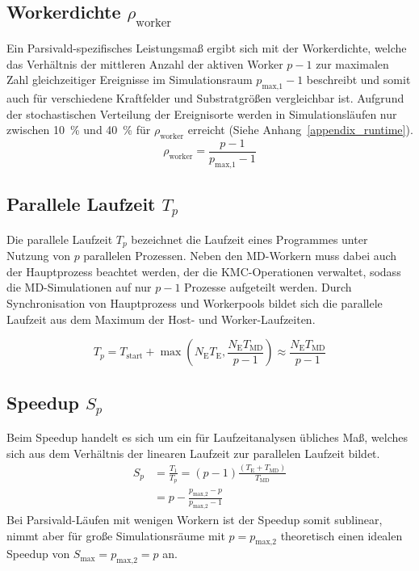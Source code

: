 \subsection{Workerdichte \texorpdfstring{$\rho_\text{worker}$}{rhoworker}}

Ein Parsivald-spezifisches Leistungsmaß ergibt sich mit der Workerdichte, welche das Verhältnis der mittleren Anzahl der aktiven Worker $p-1$ zur maximalen Zahl gleichzeitiger Ereignisse im Simulationsraum $p_\text{max,1}-1$ beschreibt und somit auch für verschiedene Kraftfelder und Substratgrößen vergleichbar ist.
Aufgrund der stochastischen Verteilung der Ereignisorte werden in Simulationsläufen nur zwischen \SI{10}{\percent} und \SI{40}{\percent} für $\rho_\text{worker}$ erreicht (Siehe Anhang~\ref{appendix_runtime}).
\begin{equation}
  \rho_\text{worker} = \frac{p - 1}{p_\text{max,1} - 1}
  \label{eq:workerdensity}
\end{equation}

\subsection{Parallele Laufzeit \texorpdfstring{$T_p$}{Tp}}

Die parallele Laufzeit $T_p$ bezeichnet die Laufzeit eines Programmes unter Nutzung von $p$ parallelen Prozessen.
Neben den MD-Workern muss dabei auch der Hauptprozess beachtet werden, der die KMC-Operationen verwaltet, sodass die MD-Simulationen auf nur $p-1$ Prozesse aufgeteilt werden.
Durch Synchronisation von Hauptprozess und Workerpools bildet sich die parallele Laufzeit aus dem Maximum der Host- und Worker-Laufzeiten.

\begin{equation}
  T_p = T_\text{start} + \max\left(N_\text{E} T_\text{E}, \frac{N_\text{E} T_\text{MD}}{p-1}\right) \approx \frac{N_\text{E} T_\text{MD}}{p-1}
  \label{eq:runtime}
\end{equation}

\subsection{Speedup \texorpdfstring{$S_p$}{Sp}}

Beim Speedup handelt es sich um ein für Laufzeitanalysen übliches Maß, welches sich aus dem Verhältnis der linearen Laufzeit zur parallelen Laufzeit bildet.
\begin{align}
  S_p & = \frac{T_1}{T_p} = \left(p-1\right) \frac{\left(T_\text{E} + T_\text{MD}\right)}{T_\text{MD}} \\
      & = p - \frac{p_\text{max,2} - p}{p_\text{max,2} - 1}
\end{align}
Bei Parsivald-Läufen mit wenigen Workern ist der Speedup somit sublinear, nimmt aber für große Simulationsräume mit $p = p_\text{max,2}$ theoretisch einen idealen Speedup von $S_\text{max} = p_\text{max,2} = p$ an.


